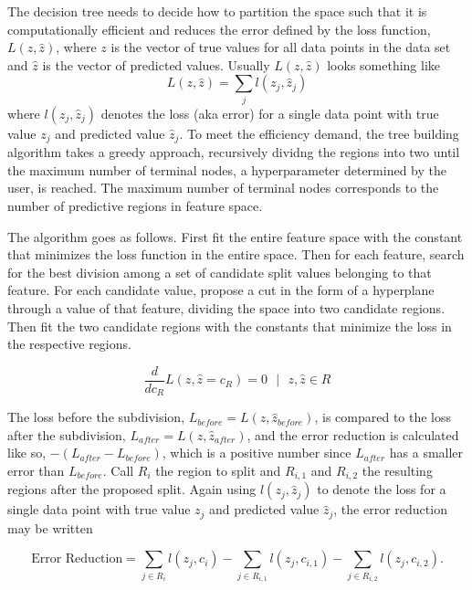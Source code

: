 \documentclass[12pt]{article}
\begin{document}
The decision tree needs to decide how to partition the space such that it is computationally efficient and reduces the error defined by the loss function, $L(z,\hat{z})$, where $z$ is the vector of true values for all data points in the data set and $\hat{z}$ is the vector of predicted values. Usually $L(z,\hat{z})$ looks something like 
\begin{equation}
L(z,\hat{z}) = \sum_{j} l(z_j,\hat{z}_j)
\end{equation}
where $l(z_j,\hat{z}_j)$ denotes the loss (aka error) for a single data point with true value $z_j$ and predicted value $\hat{z}_j$. To meet the efficiency demand, the tree building algorithm takes a greedy approach, recursively dividng the regions into two until the maximum number of terminal nodes, a hyperparameter determined by the user, is reached. The maximum number of terminal nodes corresponds to the number of predictive regions in feature space. 

The algorithm goes as follows. First fit the entire feature space with the constant that minimizes the loss function in the entire space. Then for each feature, search for the best division among a set of candidate split values belonging to that feature. For each candidate value, propose a cut in the form of a hyperplane through a value of that feature, dividing the space into two candidate regions. Then fit the two candidate regions with the constants that minimize the loss in the respective regions. 

\begin{equation}
\frac{d}{dc_{R}} L(z,\hat{z} = c_{R}) = 0 \textrm{ $|$ } z,\hat{z} \in R
\end{equation}

The loss before the subdivision, $L_{before} = L(z,\hat{z}_{before})$, is compared to the loss after the subdivision, $L_{after} = L(z,\hat{z}_{after})$, and the error reduction is calculated like so, $-(L_{after} - L_{before})$, which is a positive number since $L_{after}$ has a smaller error than $L_{before}$. Call $R_{i}$ the region to split and $R_{i,1}$ and $R_{i,2}$ the resulting regions after the proposed split. Again using $l(z_j,\hat{z}_j)$ to denote the loss for a single data point with true value $z_j$ and predicted value $\hat{z}_j$, the error reduction may be written 

\begin{equation}
\textrm{Error Reduction} = \sum_{j \in R_{i}} l(z_j,c_i) - \sum_{j \in R_{i,1}} l(z_j,c_{i,1}) - \sum_{j \in R_{i,2}} l(z_j,c_{i,2}).
\end{equation}
\end{document}
